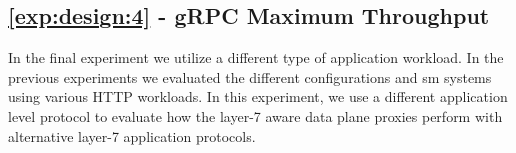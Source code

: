 
\subsection{\ref{exp:design:4} - gRPC Maximum Throughput}
\label{sec:experiments:results:per-experiment:04}

In the final experiment we utilize a different type of application workload. In the previous experiments we evaluated the different configurations and \gls{sm} systems using various HTTP workloads. In this experiment, we use a different application level protocol to evaluate how the layer-7 aware data plane proxies perform with alternative layer-7 application protocols. 



\begin{figure}
\centering
{}
\end{figure}
